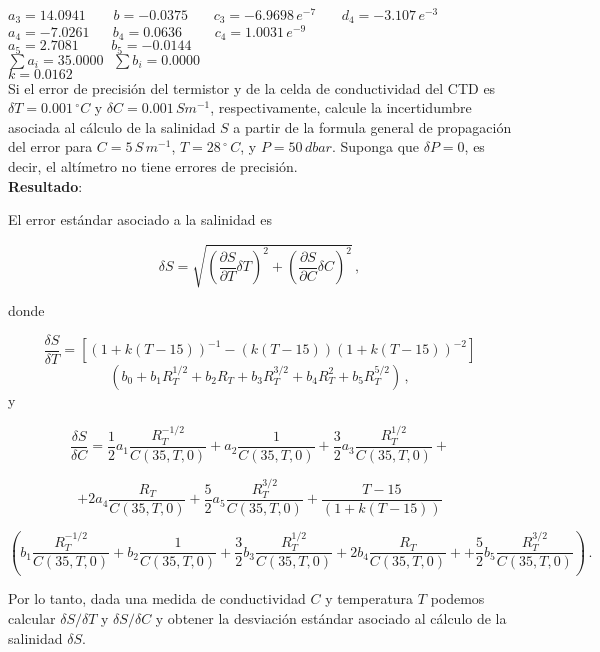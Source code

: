 \documentclass[
]{agujournal2019}
\begin{document}
\(a_3=14.0941\,\,\,\,\,\,\,\,\,\,\,\,b=-0.0375\,\,\,\,\,\,\,\,\,\,\,c_3=-6.9698\,e^{-7}\,\,\,\,\,\,\,\,\,\,\,d_4=-3.107\,e^{-3}\)
~
\(a_4=-7.0261\,\,\,\,\,\,\,\,\,\,b_4=0.0636\,\,\,\,\,\,\,\,\,\,\,\,\,\,c_4=1.0031\,e^{-9}\)\\

\(a_5=2.7081\,\,\,\,\,\,\,\,\,\,\,\,\,\,b_5=-0.0144\,\,\,\,\,\,\,\,\,\,\,\,\,\,\,\,\,\,\,\,\,\,\,\,\,\)\\

\(\sum a_i=35.0000\,\,\,\,\sum b_i=0.0000\)\\

\(k=0.0162\)\\

\noindent Si el error de precisión del termistor y de la celda de
conductividad del CTD es \(\delta{T}=0.001\,^\circ{ C}\) y
\(\delta{C}=0.001\,{ S}{ m}^{-1}\), respectivamente, calcule la
incertidumbre asociada al cálculo de la salinidad \(S\) a partir de la
formula general de propagación del error para \(C=5\,{ S}\,{ m}^{-1}\),
\(T=28\,^\circ\,{ C}\), y \(P=50\,{ dbar}\). Suponga que
\(\delta{P}=0\), es decir, el altímetro no tiene errores de precisión.\\

\textbf{Resultado}:

\noindent El error estándar asociado a la salinidad es

\[\delta{S}=\sqrt{\left( \frac{\partial{S}}{\partial{T}}\delta{T} \right)^2 + \left( \frac{\partial{S}}{\partial{C}}\delta{C}\right)^2}\,,\]

donde

\[\frac{\delta{S}}{\delta{T}}=
      \left[(1+k(T-15))^{-1} - (k(T-15))(1+k(T-15))^{-2}\right]\]
\[\left (b_0+b_1 R_T^{1/2}+b_2 R_T+b_3 R_T^{3/2}+b_4 R_T^{2}+b_5 R_T^{5/2}\right)\,,\]
y

\[\frac{\delta{S}}{\delta{C}}=
                 \frac{1}{2} a_1 \frac{R_T^{-1/2}}{C(35,T,0)} +
         a_2 \frac{1}{C(35,T,0)} +
             \frac{3}{2}a_3 \frac{R_T^{1/2}}{C(35,T,0)}+ \]

\[+2 a_4 \frac{R_T}{C(35,T,0)} +\frac{5}{2} a_5 \frac{R_T^{3/2}}{C(35,T,0)}+\frac{T-15}{(1+k(T-15))}\]

\[\left(b_1 \frac{R_T^{-1/2}}{C(35,T,0)} +
         b_2 \frac{1}{C(35,T,0)} +
             \frac{3}{2}b_3 \frac{R_T^{1/2}}{C(35,T,0)}+
               2 b_4 \frac{R_T}{C(35,T,0)} +
     +\frac{5}{2} b_5 \frac{R_T^{3/2}}{C(35,T,0)}
     \right)\,.\]

\noindent Por lo tanto, dada una medida de conductividad \(C\) y
temperatura \(T\) podemos calcular \({\delta{S}}/{\delta{T}}\) y
\({\delta{S}}/{\delta{C}}\) y obtener la desviación estándar asociado al
cálculo de la salinidad \(\delta{S}\).
\end{document}

